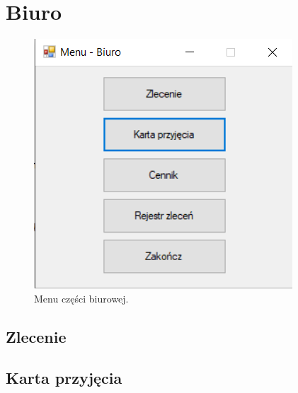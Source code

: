
\rozdzial

\section{Biuro}
\label{biuro}

\begin{figure}[htb]
	\centering
	\includegraphics{obrazki/Biuro/menu_biuro.png}
	\caption{Menu części biurowej.}
	\label{menuBiuro}
\end{figure}

\subsection{Zlecenie}
\label{zlecenie}

\subsection{Karta przyjęcia}
\label{karta_przyjecia}

